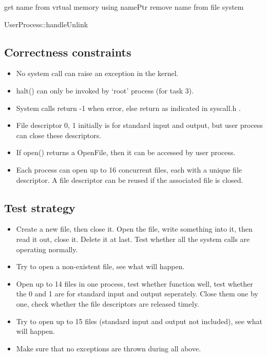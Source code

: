 \documentclass[a4paper,10pt]{article}
\begin{document}
\begin{algorithm}
\DontPrintSemicolon
{}
get name from vrtual memory using namePtr\;
remove name from file system\;
\caption{UserProcess::handleUnlink}
\label{algo:unlink}
\end{algorithm}

\subsection{Correctness constraints}
\begin{itemize}
\item No system call can raise an exception in the kernel.
\item halt() can only be invoked by `root' process (for task 3).
\item System calls return -1 when error, else return as indicated in syscall.h .
\item File descriptor 0, 1 initially is for standard input and output, but user process can close these descriptors.
\item If open() returns a OpenFile, then it can be accessed by user process.
\item Each process can open up to 16 concurrent files, each with a unique file descriptor. A file descriptor can be reused if the associated file is closed.
\end{itemize}

\subsection{Test strategy}
\begin{itemize}
\item Create a new file, then close it. Open the file, write something into it, then read it out, close it. Delete it at last. Test whether all the system calls are operating normally.
\item Try to open a non-existent file, see what will happen.
\item Open up to 14 files in one process, test whether function well, test whether the 0 and 1 are for standard input and output seperately. Close them one by one, check whether the file descriptors are released timely.
\item Try to open up to 15 files (standard input and output not included), see what will happen.
\item Make sure that no exceptions are thrown during all above.
\end{itemize}
\end{document}
